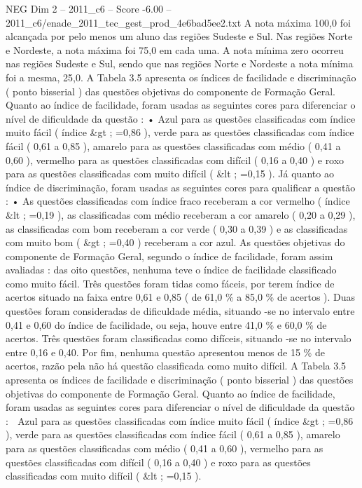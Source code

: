 \begin{textsample}{NEG Dim 2 – 2011\_c6 – Score -6.00 – 2011\_c6/enade\_2011\_tec\_gest\_prod\_4e6bad5ee2.txt}
A nota máxima 100,0 foi alcançada por pelo menos um aluno das regiões Sudeste e Sul.
Nas regiões Norte e Nordeste, a nota máxima foi 75,0 em cada uma.
A nota mínima zero ocorreu nas regiões Sudeste e Sul, sendo que nas regiões Norte e Nordeste a nota mínima foi a mesma, 25,0.
A Tabela 3.5 apresenta os índices de facilidade e discriminação ( ponto bisserial ) das questões objetivas do componente de Formação Geral.
Quanto ao índice de facilidade, foram usadas as seguintes cores para diferenciar o nível de dificuldade da questão : • Azul para as questões classificadas com índice muito fácil ( índice \&gt ; =0,86 ), verde para as questões classificadas com índice fácil ( 0,61 a 0,85 ), amarelo para as questões classificadas com médio ( 0,41 a 0,60 ), vermelho para as questões classificadas com difícil ( 0,16 a 0,40 ) e roxo para as questões classificadas com muito difícil ( \&lt ; =0,15 ).
Já quanto ao índice de discriminação, foram usadas as seguintes cores para qualificar a questão : • As questões classificadas com índice fraco receberam a cor vermelho ( índice \&lt ; =0,19 ), as classificadas com médio receberam a cor amarelo ( 0,20 a 0,29 ), as classificadas com bom receberam a cor verde ( 0,30 a 0,39 ) e as classificadas com muito bom ( \&gt ; =0,40 ) receberam a cor azul.
As questões objetivas do componente de Formação Geral, segundo o índice de facilidade, foram assim avaliadas : das oito questões, nenhuma teve o índice de facilidade classificado como muito fácil.
Três questões foram tidas como fáceis, por terem índice de acertos situado na faixa entre 0,61 e 0,85 ( de 61,0 \% a 85,0 \% de acertos ).
Duas questões foram consideradas de dificuldade média, situando -se no intervalo entre 0,41 e 0,60 do índice de facilidade, ou seja, houve entre 41,0 \% e 60,0 \% de acertos.
Três questões foram classificadas como difíceis, situando -se no intervalo entre 0,16 e 0,40.
Por fim, nenhuma questão apresentou menos de 15 \% de acertos, razão pela não há questão classificada como muito difícil.
A Tabela 3.5 apresenta os índices de facilidade e discriminação ( ponto bisserial ) das questões objetivas do componente de Formação Geral.
Quanto ao índice de facilidade, foram usadas as seguintes cores para diferenciar o nível de dificuldade da questão :  Azul para as questões classificadas com índice muito fácil ( índice \&gt ; =0,86 ), verde para as questões classificadas com índice fácil ( 0,61 a 0,85 ), amarelo para as questões classificadas com médio ( 0,41 a 0,60 ), vermelho para as questões classificadas com difícil ( 0,16 a 0,40 ) e roxo para as questões classificadas com muito difícil ( \&lt ; =0,15 ).

\end{textsample}

